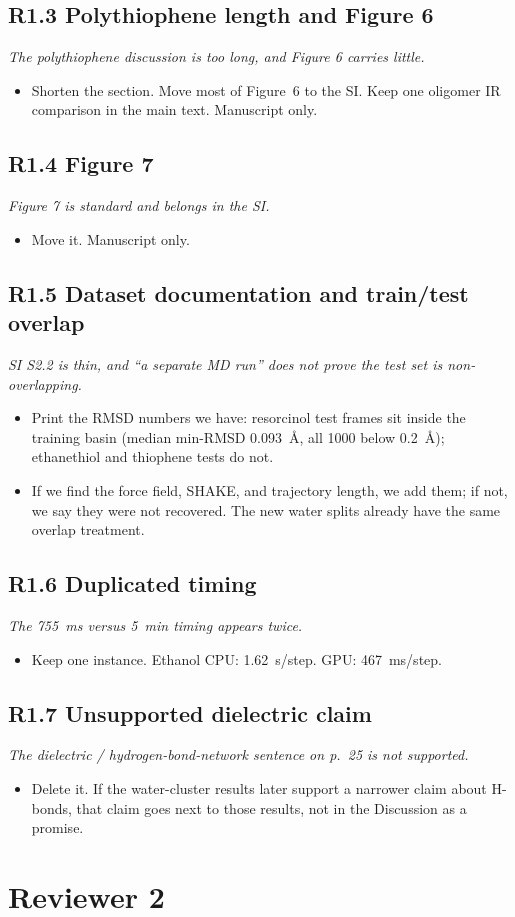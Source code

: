 \documentclass[11pt]{article}
\newcommand{\revpoint}[1]{\textit{#1}\par\nopagebreak\vspace{0.35em}}
\newcommand{\revhead}[1]{\subsection*{#1}}
\begin{document}
\revhead{R1.3 Polythiophene length and Figure 6}
\revpoint{The polythiophene discussion is too long, and Figure 6 carries little.}
\begin{itemize}
  \item Shorten the section. Move most of Figure~6 to the SI. Keep one oligomer IR
        comparison in the main text. Manuscript only.
\end{itemize}

\revhead{R1.4 Figure 7}
\revpoint{Figure 7 is standard and belongs in the SI.}
\begin{itemize}
  \item Move it. Manuscript only.
\end{itemize}

\revhead{R1.5 Dataset documentation and train/test overlap}
\revpoint{SI S2.2 is thin, and ``a separate MD run'' does not prove the test set is non-overlapping.}
\begin{itemize}
  \item Print the RMSD numbers we have: resorcinol test frames sit inside the training
        basin (median min-RMSD 0.093~\AA, all 1000 below 0.2~\AA); ethanethiol and
        thiophene tests do not.
  \item If we find the force field, SHAKE, and trajectory length, we add them; if not,
        we say they were not recovered. The new water splits already have the same
        overlap treatment.
\end{itemize}

\revhead{R1.6 Duplicated timing}
\revpoint{The 755~ms versus 5~min timing appears twice.}
\begin{itemize}
  \item Keep one instance. Ethanol CPU: 1.62~s/step. GPU: 467~ms/step.
\end{itemize}

\revhead{R1.7 Unsupported dielectric claim}
\revpoint{The dielectric / hydrogen-bond-network sentence on p.~25 is not supported.}
\begin{itemize}
  \item Delete it. If the water-cluster results later support a narrower claim about
        H-bonds, that claim goes next to those results, not in the Discussion as a
        promise.
\end{itemize}

\section{Reviewer 2}
\end{document}
